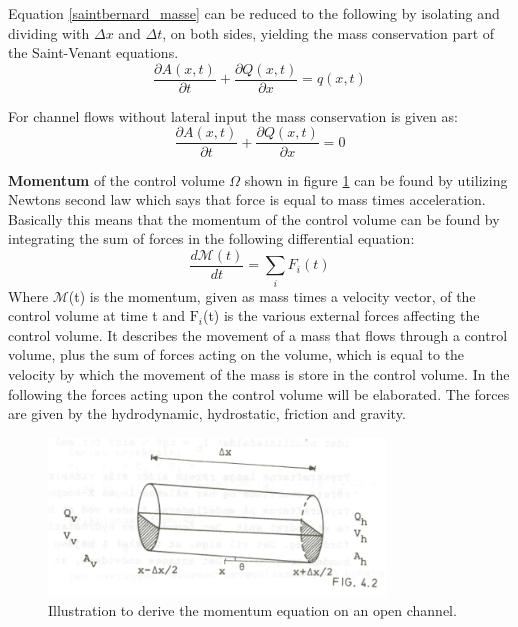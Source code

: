 Equation \ref{saintbernard_masse} can be reduced to the following by isolating and dividing with $\Delta x$ and $\Delta t$, on both sides, yielding the mass conservation part of the Saint-Venant equations.
\begin{equation}	
\frac{\partial A(x,t)}{\partial t} + \frac{\partial Q(x,t)}{\partial x}=q(x,t)
\label{saintbernard_mass_lateral}
\end{equation}

For channel flows without lateral input the mass conservation is given as:
\begin{equation}	
\boxed{\frac{\partial A(x,t)}{\partial t} + \frac{\partial Q(x,t)}{\partial x}=0}
\label{saintbernard_mass}
\end{equation}


\textbf{Momentum} of the control volume $\Omega$ shown in figure \ref{fig:momentum_picture} can be found by utilizing Newtons second law which says that force is equal to mass times acceleration.  
Basically this means that the momentum of the control volume can be found by integrating the sum of forces in the following differential equation:
\begin{equation}\label{eq:momentum_eq}
	\frac{d \mathcal{M}(t)}{dt} = \sum_{i}F_i(t)
\end{equation} 
Where $\mathcal{M}$(t) is the momentum, given as mass times a velocity vector, of the control volume at time t and $\text{F}_i$(t) is the various external forces affecting the control volume. It describes the movement of a mass that flows through a control volume, plus the sum of forces acting on the volume, which is equal to the velocity by which the movement of the mass is store in the control volume. In the following the forces acting upon the control volume will be elaborated. The forces are given by the hydrodynamic, hydrostatic, friction and gravity.

\begin{figure}[H]
\centering
\includegraphics[width=0.8\textwidth]{report/modeling/pictures/momentum_picture.png}
\caption{Illustration to derive the momentum equation on an open channel.}
\label{fig:momentum_picture}
\end{figure}


